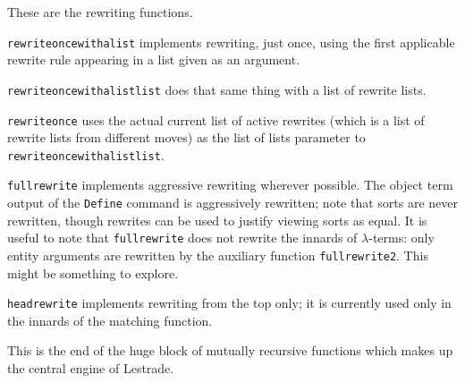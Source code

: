 \documentclass{article}
\begin{document}
These are the rewriting functions.

{\tt rewriteoncewithalist} implements rewriting, just once, using the first applicable rewrite rule appearing in a list given as an argument.

{\tt rewriteoncewithalistlist} does that same thing with a list of rewrite lists.

{\tt rewriteonce} uses the actual current list of active rewrites (which is a list of rewrite lists from different moves) as the list of lists parameter to {\tt rewriteoncewithalistlist}.

{\tt fullrewrite} implements aggressive rewriting wherever possible.   The object term output of the {\tt Define} command is aggressively rewritten;  note that sorts
are never rewritten, though rewrites can be used to justify viewing sorts as equal.  It is useful to note that {\tt fullrewrite} does not rewrite the innards of $\lambda$-terms:
only entity arguments are rewritten by the auxiliary function {\tt fullrewrite2}.  This might be something to explore.

{\tt headrewrite} implements rewriting from the top only;  it is currently used only in the innards of the matching function.

This is the end of the huge block of mutually recursive functions which makes up the central engine of Lestrade.
\end{document}
